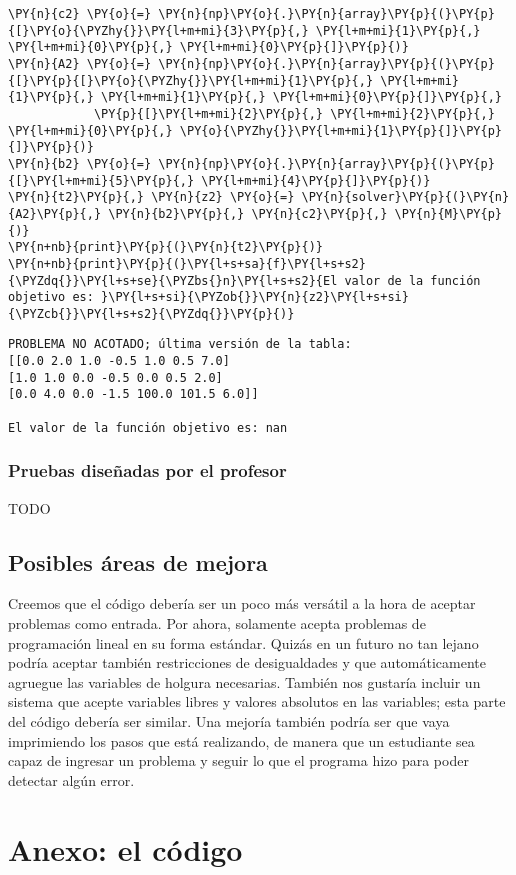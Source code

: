 \documentclass[12pt]{article}
\begin{document}
\begin{tcolorbox}[breakable, size=fbox, boxrule=1pt, pad at break*=1mm,colback=cellbackground, colframe=cellborder]
\begin{Verbatim}[commandchars=\\\{\}]
\PY{n}{c2} \PY{o}{=} \PY{n}{np}\PY{o}{.}\PY{n}{array}\PY{p}{(}\PY{p}{[}\PY{o}{\PYZhy{}}\PY{l+m+mi}{3}\PY{p}{,} \PY{l+m+mi}{1}\PY{p}{,} \PY{l+m+mi}{0}\PY{p}{,} \PY{l+m+mi}{0}\PY{p}{]}\PY{p}{)}
\PY{n}{A2} \PY{o}{=} \PY{n}{np}\PY{o}{.}\PY{n}{array}\PY{p}{(}\PY{p}{[}\PY{p}{[}\PY{o}{\PYZhy{}}\PY{l+m+mi}{1}\PY{p}{,} \PY{l+m+mi}{1}\PY{p}{,} \PY{l+m+mi}{1}\PY{p}{,} \PY{l+m+mi}{0}\PY{p}{]}\PY{p}{,}
            \PY{p}{[}\PY{l+m+mi}{2}\PY{p}{,} \PY{l+m+mi}{2}\PY{p}{,} \PY{l+m+mi}{0}\PY{p}{,} \PY{o}{\PYZhy{}}\PY{l+m+mi}{1}\PY{p}{]}\PY{p}{]}\PY{p}{)}
\PY{n}{b2} \PY{o}{=} \PY{n}{np}\PY{o}{.}\PY{n}{array}\PY{p}{(}\PY{p}{[}\PY{l+m+mi}{5}\PY{p}{,} \PY{l+m+mi}{4}\PY{p}{]}\PY{p}{)}
\PY{n}{t2}\PY{p}{,} \PY{n}{z2} \PY{o}{=} \PY{n}{solver}\PY{p}{(}\PY{n}{A2}\PY{p}{,} \PY{n}{b2}\PY{p}{,} \PY{n}{c2}\PY{p}{,} \PY{n}{M}\PY{p}{)}
\PY{n+nb}{print}\PY{p}{(}\PY{n}{t2}\PY{p}{)}
\PY{n+nb}{print}\PY{p}{(}\PY{l+s+sa}{f}\PY{l+s+s2}{\PYZdq{}}\PY{l+s+se}{\PYZbs{}n}\PY{l+s+s2}{El valor de la función objetivo es: }\PY{l+s+si}{\PYZob{}}\PY{n}{z2}\PY{l+s+si}{\PYZcb{}}\PY{l+s+s2}{\PYZdq{}}\PY{p}{)}
\end{Verbatim}
\end{tcolorbox}

\begin{Verbatim}[commandchars=\\\{\}]
PROBLEMA NO ACOTADO; última versión de la tabla:
[[0.0 2.0 1.0 -0.5 1.0 0.5 7.0]
[1.0 1.0 0.0 -0.5 0.0 0.5 2.0]
[0.0 4.0 0.0 -1.5 100.0 101.5 6.0]]

El valor de la función objetivo es: nan
\end{Verbatim}

\subsubsection{Pruebas diseñadas por el profesor}
TODO

\subsection{Posibles áreas de mejora}
Creemos que el código debería ser un poco más versátil a la hora de aceptar problemas como entrada. Por ahora, solamente acepta problemas de programación lineal en su forma estándar. Quizás en un futuro no tan lejano podría aceptar también restricciones de desigualdades y que automáticamente agruegue las variables de holgura necesarias. También nos gustaría incluir un sistema que acepte variables libres y valores absolutos en las variables; esta parte del código debería ser similar. Una mejoría también podría ser que vaya imprimiendo los pasos que está realizando, de manera que un estudiante sea capaz de ingresar un problema y seguir lo que el programa hizo para poder detectar algún error.

\section{Anexo: el código}

\end{document}
